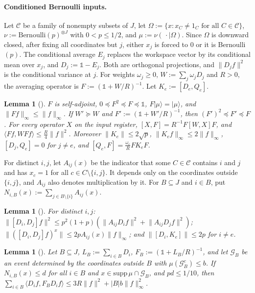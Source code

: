 \documentclass[11pt]{article}
\newtheorem{lemma}[theorem]{Lemma}
\theoremstyle{remark}
\newcommand{\Id}{\mathbb{1}}
\newcommand{\abs}[1]{\lvert #1\rvert}
\newcommand{\norm}[1]{\lVert #1\rVert}
\newcommand{\ip}[2]{\langle #1, #2\rangle}
\newcommand{\ket}[1]{\lvert #1\rangle}
\newcommand{\Ev}{\mathcal{G}}
\begin{document}
\paragraph{Conditioned Bernoulli inputs.} Let $\mathcal C$ be a family of nonempty subsets of $J$, let $\Omega:=\{x:x_C\ne1_C\text{ for all }C\in\mathcal C\}$, $\nu:=\mathrm{Bernoulli}(p)^{\otimes J}$ with $0<p\le1/2$, and $\mu:=\nu(\,\cdot\mid\Omega)$. Since $\Omega$ is downward closed, after fixing all coordinates but $j$, either $x_j$ is forced to $0$ or it is Bernoulli$(p)$. The conditional average $E_j$ replaces the workspace vector by its conditional mean over $x_j$, and $D_j:=\Id-E_j$. Both are orthogonal projections, and $\norm{D_jf}^2$ is the conditional variance at $j$. For weights $\omega_j\ge0$, $W:=\sum_j\omega_jD_j$ and $R>0$, the averaging operator is $F:=(\Id+W/R)^{-1}$. Let $K_e:=[D_e,Q_e]$.

\begin{lemma}[{\cite[Lemma~4.2, (4.14), (4.15)]{CGZ26}}]\label{lem:avg}
$F$ is self-adjoint, $0\preceq F^2\preceq F\preceq\Id$, $F\ket\mu=\ket\mu$, and $\norm{Ff}_\infty\le\norm f_\infty$. If $W'\succeq W$ and $F':=(\Id+W'/R)^{-1}$, then $(F')^2\preceq F'\preceq F$. For every operator $X$ on the input register, $[X,F]=R^{-1}F[W,X]F$, and $\ip{Ff}{WFf}\le\frac R4\norm f^2$. Moreover $\norm{K_e}\le2\sqrt p$, $\norm{K_ef}_\infty\le2\norm f_\infty$, $[D_j,Q_e]=0$ for $j\ne e$, and $[Q_e,F]=\frac{\omega_e}RFK_eF$.
\end{lemma}

For distinct $i,j$, let $A_{ij}(x)$ be the indicator that some $C\in\mathcal C$ contains $i$ and $j$ and has $x_c=1$ for all $c\in C\setminus\{i,j\}$. It depends only on the coordinates outside $\{i,j\}$, and $A_{ij}$ also denotes multiplication by it. For $B\subseteq J$ and $i\in B$, put $N_{i,B}(x):=\sum_{j\in B\setminus\{i\}}A_{ij}(x)$.

\begin{lemma}[{\cite[Lemma~4.3, (5.33)]{CGZ26}}]\label{lem:interact}
For distinct $i,j$: $\norm{[D_i,D_j]f}^2\le p^2(1+p)(\norm{A_{ij}D_if}^2+\norm{A_{ij}D_jf}^2)$; $\norm{([D_i,D_j]f)^x}\le2pA_{ij}(x)\norm f_\infty$; and $\norm{[D_i,K_e]}\le2p$ for $i\ne e$.
\end{lemma}

\begin{lemma}[{\cite[Lemma~4.5]{CGZ26}}]\label{lem:block45}
Let $B\subseteq J$, $L_B:=\sum_{i\in B}D_i$, $F_B:=(\Id+L_B/R)^{-1}$, and let $\Ev_B$ be an event determined by the coordinates outside $B$ with $\mu(\Ev_B^c)\le b$. If $N_{i,B}(x)\le d$ for all $i\in B$ and $x\in\mathrm{supp}\,\mu\cap\Ev_B$, and $pd\le1/10$, then $\sum_{i\in B}\ip{D_if}{F_BD_if}\le3R\norm f^2+\abs Bb\norm f_\infty^2$.
\end{lemma}
\end{document}
